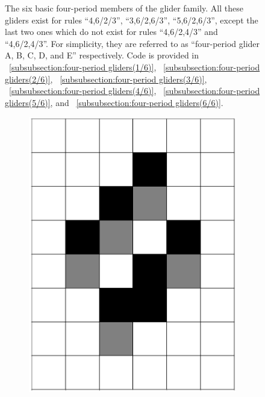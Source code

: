 \documentclass[12pt]{article}
\numberwithin{figure}{section} %
\begin{document}
\begin{figure}[H]
   \caption[Four-period gliders]{The six basic four-period members of the glider family. All these gliders exist for rules “4,6/2/3”, “3,6/2,6/3”, “5,6/2,6/3”, except the last two ones which do not exist for rules “4,6/2,4/3” and “4,6/2,4/3”. For simplicity, they are referred to as “four-period glider A, B, C, D, and E” respectively. Code is provided in ~\ref{subsubsection:four-period gliders(1/6)}, ~\ref{subsubsection:four-period gliders(2/6)}, ~\ref{subsubsection:four-period gliders(3/6)}, ~\ref{subsubsection:four-period gliders(4/6)}, ~\ref{subsubsection:four-period gliders(5/6)}, and ~\ref{subsubsection:four-period gliders(6/6)}.}
   \label{fig:four-period gliders}
   \vspace{-1.5em}
\end{figure}

\begin{figure}[H]
  \begin{subfigure}{0.19\textwidth}
     \centering
     \includegraphics[width=\linewidth]{Section4/21.0}

\end{subfigure}
\end{figure}
\end{document}
